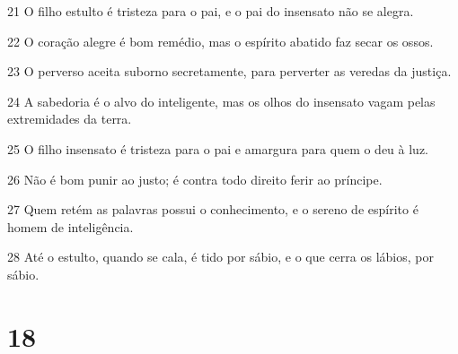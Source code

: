 \par 21 O filho estulto é tristeza para o pai, e o pai do insensato não se alegra.
\par 22 O coração alegre é bom remédio, mas o espírito abatido faz secar os ossos.
\par 23 O perverso aceita suborno secretamente, para perverter as veredas da justiça.
\par 24 A sabedoria é o alvo do inteligente, mas os olhos do insensato vagam pelas extremidades da terra.
\par 25 O filho insensato é tristeza para o pai e amargura para quem o deu à luz.
\par 26 Não é bom punir ao justo; é contra todo direito ferir ao príncipe.
\par 27 Quem retém as palavras possui o conhecimento, e o sereno de espírito é homem de inteligência.
\par 28 Até o estulto, quando se cala, é tido por sábio, e o que cerra os lábios, por sábio.

\chapter{18}

